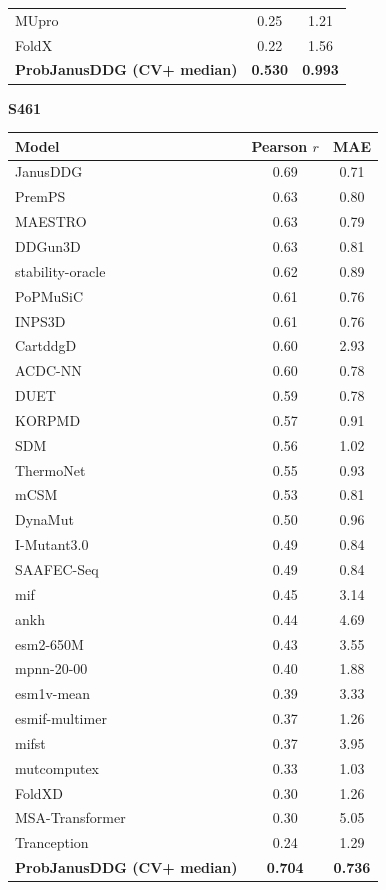 \documentclass[11pt]{article}
\begin{document}
\begin{table}[h]
\begin{minipage}[t]{0.485\textwidth}
\begin{tabular}{lcc}
MUpro             & 0.25 & 1.21 \\
FoldX             & 0.22 & 1.56 \\
\midrule
\textbf{ProbJanusDDG (CV+ median)} & \textbf{0.530} & \textbf{0.993} \\
\bottomrule
\end{tabular}
\end{minipage}\hfill
\begin{minipage}[t]{0.485\textwidth}
\centering
\textbf{S461}\\[2pt]
\begin{tabular}{lcc}
\toprule
Model & Pearson \(r\) & MAE \\
\midrule
JanusDDG           & 0.69 & 0.71 \\
PremPS             & 0.63 & 0.80 \\
MAESTRO            & 0.63 & 0.79 \\
DDGun3D            & 0.63 & 0.81 \\
stability-oracle   & 0.62 & 0.89 \\
PoPMuSiC           & 0.61 & 0.76 \\
INPS3D             & 0.61 & 0.76 \\
CartddgD           & 0.60 & 2.93 \\
ACDC-NN            & 0.60 & 0.78 \\
DUET               & 0.59 & 0.78 \\
KORPMD             & 0.57 & 0.91 \\
SDM                & 0.56 & 1.02 \\
ThermoNet          & 0.55 & 0.93 \\
mCSM               & 0.53 & 0.81 \\
DynaMut            & 0.50 & 0.96 \\
I-Mutant3.0        & 0.49 & 0.84 \\
SAAFEC-Seq         & 0.49 & 0.84 \\
mif                & 0.45 & 3.14 \\
ankh               & 0.44 & 4.69 \\
esm2-650M          & 0.43 & 3.55 \\
mpnn-20-00         & 0.40 & 1.88 \\
esm1v-mean         & 0.39 & 3.33 \\
esmif-multimer     & 0.37 & 1.26 \\
mifst              & 0.37 & 3.95 \\
mutcomputex        & 0.33 & 1.03 \\
FoldXD             & 0.30 & 1.26 \\
MSA-Transformer   & 0.30 & 5.05 \\
Tranception        & 0.24 & 1.29 \\
\midrule
\textbf{ProbJanusDDG (CV+ median)} & \textbf{0.704} & \textbf{0.736} \\
\bottomrule
\end{tabular}
\end{minipage}
\end{table}
\end{document}
